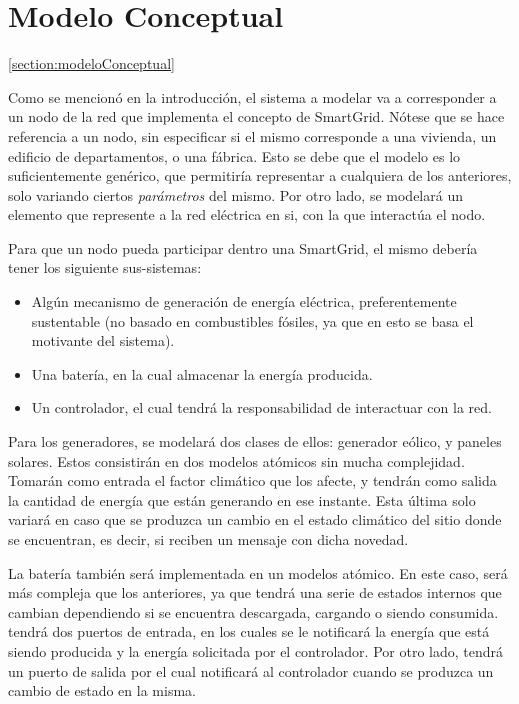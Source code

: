 \section{Modelo Conceptual}\ref{section:modeloConceptual}

Como se mencionó en la introducción, el sistema a modelar va a corresponder a
un nodo de la red que implementa el concepto de SmartGrid. Nótese que se hace
referencia a un nodo, sin especificar si el mismo corresponde a una vivienda,
un edificio de departamentos, o una fábrica. Esto se debe que el modelo es lo
suficientemente genérico, que permitiría representar a cualquiera de los
anteriores, solo variando ciertos \textit{parámetros} del mismo. Por otro
lado, se modelará un elemento que represente a la red eléctrica en si, con la
que interactúa el nodo.

Para que un nodo pueda participar dentro una SmartGrid, el mismo debería
tener los siguiente sus-sistemas:
\begin{itemize}
    \item Algún mecanismo de generación de energía eléctrica, preferentemente
    sustentable (no basado en combustibles fósiles, ya que en esto se basa el
    motivante del sistema).
    \item Una batería, en la cual almacenar la energía producida.
    \item Un controlador, el cual tendrá la responsabilidad de interactuar con la red.
\end{itemize}

Para los generadores, se modelará dos clases de ellos: generador eólico, y
paneles solares. Estos consistirán en dos modelos atómicos sin mucha
complejidad. Tomarán como entrada el factor climático que los afecte, y
tendrán como salida la cantidad de energía que están generando en ese
instante. Esta última solo variará en caso que se produzca un cambio en el
estado climático del sitio donde se encuentran, es decir, si reciben un
mensaje con dicha novedad.

La batería también será implementada en un modelos atómico. En este caso,
será más compleja que los anteriores, ya que tendrá una serie de estados
internos que cambian dependiendo si se encuentra descargada, cargando o
siendo consumida. tendrá dos puertos de entrada, en los cuales se le
notificará la energía que está siendo producida y la energía solicitada por
el controlador. Por otro lado, tendrá un puerto de salida por el cual
notificará al controlador cuando se produzca un cambio de estado en la misma.

